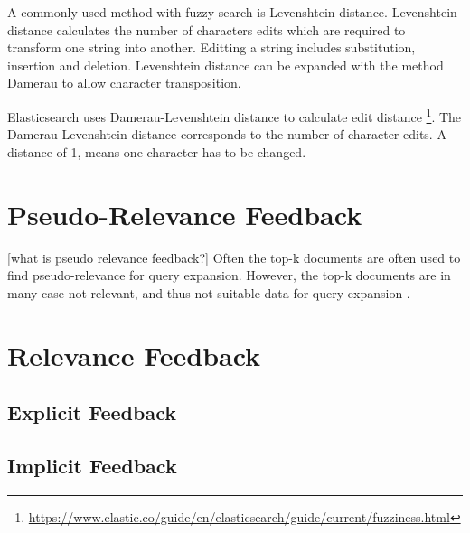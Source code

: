 A commonly used method with fuzzy search is Levenshtein distance.
Levenshtein distance calculates the number of characters edits which are required to transform one string into another.
Editting a string includes substitution, insertion and deletion.
Levenshtein distance can be expanded with the method Damerau to allow character transposition.

Elasticsearch uses Damerau-Levenshtein distance to calculate edit distance \footnote{\url{https://www.elastic.co/guide/en/elasticsearch/guide/current/fuzziness.html}}.
The Damerau-Levenshtein distance corresponds to the number of character edits.
A distance of 1, means one character has to be changed.

\section{Pseudo-Relevance Feedback}
[what is pseudo relevance feedback?]
Often the top-k documents are often used to find pseudo-relevance for query expansion.
However, the top-k documents are in many case not relevant, and thus not suitable data for query expansion \cite{pseudo-relevance-invalid}.

\section{Relevance Feedback}

\subsection{Explicit Feedback}

\subsection{Implicit Feedback}
